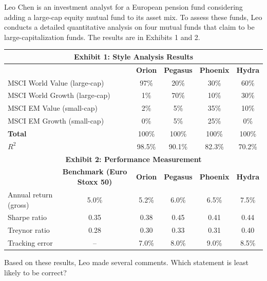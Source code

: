 \documentclass{article}
\newcounter{question} %
\begin{document}
\begin{question}
    Leo Chen is an investment analyst for a European pension fund considering adding a large-cap equity mutual fund to its asset mix. To assess these funds, Leo conducts a detailed quantitative analysis on four mutual funds that claim to be large-capitalization funds. The results are in Exhibits 1 and 2.

    \begin{table}[H]
        \centering
        \renewcommand{\arraystretch}{1.2}
        \begin{tabular}{|l|c|c|c|c|c|}
            \hline
            \multicolumn{6}{|c|}{\textbf{Exhibit 1: Style Analysis Results}} \\
            \hline
            \multicolumn{2}{|l|}{ } & \textbf{Orion} & \textbf{Pegasus} & \textbf{Phoenix} & \textbf{Hydra} \\
            \hline
            \multicolumn{2}{|l|}{MSCI World Value (large-cap)} & 97\%  & 20\%  & 30\%  & 60\%  \\
            \multicolumn{2}{|l|}{MSCI World Growth (large-cap)} & 1\%   & 70\%  & 10\%  & 30\%  \\
            \multicolumn{2}{|l|}{MSCI EM Value (small-cap)}   & 2\%   & 5\%   & 35\%  & 10\%  \\
            \multicolumn{2}{|l|}{MSCI EM Growth (small-cap)}  & 0\%   & 5\%   & 25\%  & 0\%   \\
            \multicolumn{2}{|l|}{\textbf{Total}}              & 100\% & 100\% & 100\% & 100\% \\
            \hline
            \multicolumn{2}{|l|}{$R^2$}                      & 98.5\% & 90.1\% & 82.3\% & 70.2\% \\
            \hline
            \multicolumn{6}{|c|}{\textbf{Exhibit 2: Performance Measurement}} \\
            \hline
            & \textbf{Benchmark (Euro Stoxx 50)} & \textbf{Orion} & \textbf{Pegasus} & \textbf{Phoenix} & \textbf{Hydra} \\
            \hline
            Annual return (gross) & 5.0\% & 5.2\% & 6.0\% & 6.5\% & 7.5\% \\
            Sharpe ratio          & 0.35  & 0.38 & 0.45 & 0.41 & 0.44 \\
            Treynor ratio         & 0.28  & 0.30 & 0.33 & 0.31 & 0.40 \\
            Tracking error        & --    & 7.0\%  & 8.0\% & 9.0\% & 8.5\% \\
            \hline
        \end{tabular}
    \end{table}

    Based on these results, Leo made several comments. Which statement is least likely to be correct?
\end{question}
\end{document}
